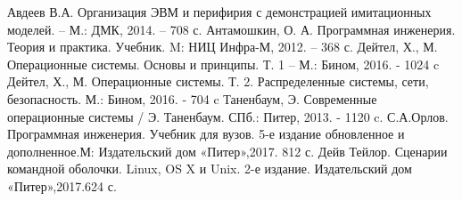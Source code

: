 \begin{thebibliography}{00}
	 Авдеев В.А. Организация ЭВМ и перифирия с демонстрацией имитационных моделей. – М.: ДМК, 2014. – 708 с.
	 Антамошкин, О. А. Программная инженерия. Теория и практика. Учебник. M: НИЦ Инфра-М, 2012. – 368 с.
	 Дейтел, Х., М. Операционные системы. Основы и принципы. Т. 1 – М.: Бином, 2016. - 1024 c
	 Дейтел, Х., М. Операционные системы. Т. 2. Распределенные системы, сети, безопасность. М.: Бином, 2016. - 704 c
	 Таненбаум, Э. Современные операционные системы / Э. Таненбаум. СПб.: Питер, 2013. - 1120 c.
	 С.А.Орлов. Программная инженерия. Учебник для вузов. 5-е издание обновленное и дополненное.М: Издательский дом «Питер»,2017. 812 с.
	 Дейв Тейлор. Сценарии командной оболочки. Linux, OS X и Unix. 2-е издание. Издательский дом «Питер»,2017.624 с.
\end{thebibliography}

